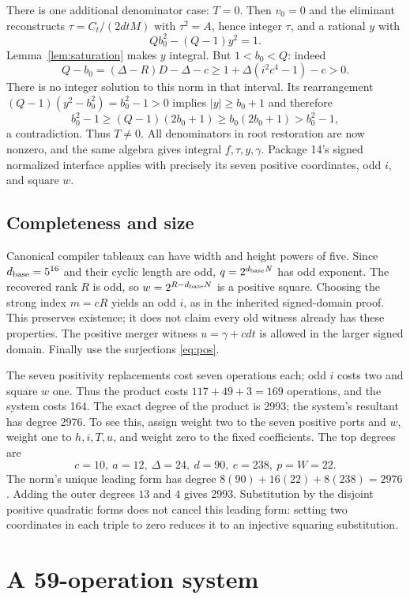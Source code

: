 \documentclass[11pt,letterpaper]{article}
\theoremstyle{remark}\newtheorem{remark}[theorem]{Remark}
\newcommand{\IntegerDegree}{2993}
\begin{document}
There is one additional denominator case: $T=0$. Then $v_0=0$ and the
eliminant reconstructs $\tau=C_t/(2dtM)$ with $\tau^2=A$, hence integer
$\tau$, and a rational $y$ with
\[
 Qb_0^2-(Q-1)y^2=1.
\]
Lemma~\ref{lem:saturation} makes $y$ integral. But $1<b_0<Q$: indeed
\[
 Q-b_0=(\Delta-R)D-\Delta-c
 \geq1+\Delta(i^2c^4-1)-c>0.
\]
There is no integer solution to this norm in that interval. Its rearrangement
$(Q-1)(y^2-b_0^2)=b_0^2-1>0$ implies $|y|\geq b_0+1$ and therefore
\[
 b_0^2-1\geq(Q-1)(2b_0+1)\geq b_0(2b_0+1)>b_0^2-1,
\]
a contradiction. Thus $T\ne0$. All denominators in root restoration are now
nonzero, and the same algebra gives integral $f,\tau,y,\gamma$.
Package 14's signed normalized interface applies with precisely its seven
positive coordinates, odd $i$, and square $w$.

\subsection{Completeness and size}
Canonical compiler tableaux can have width and height powers of five. Since
$d_{\rm base}=5^{16}$ and their cyclic length are odd, $q=2^{d_{\rm base}N}$
has odd exponent. The recovered rank $R$ is odd, so
$w=2^{R-d_{\rm base}N}$ is a positive square. Choosing the strong index
$m=cR$ yields an odd $i$, as in the inherited signed-domain proof. This
preserves existence; it does not claim every old witness already has these
properties. The positive merger witness $u=\gamma+cdt$ is allowed in the
larger signed domain. Finally use the surjections \eqref{eq:pos}.

The seven positivity replacements cost seven operations each; odd $i$ costs
two and square $w$ one. Thus the product costs $117+49+3=169$ operations,
and the system costs 164. The exact degree of the product is \IntegerDegree;
the system's resultant has degree 2976. To see this, assign weight two to
the seven positive ports and $w$, weight one to $h,i,T,u$, and weight zero
to the fixed coefficients. The top degrees are
\[
 c=10,\ a=12,\ \Delta=24,\ d=90,\ e=238,\ p=W=22.
\]
The norm's unique leading form has degree
$8(90)+16(22)+8(238)=2976$. Adding the outer degrees $13$ and $4$ gives
2993. Substitution by the disjoint positive quadratic forms does not cancel
this leading form: setting two coordinates in each triple to zero reduces
it to an injective squaring substitution.

\section{A 59-operation system}\label{sec:system59}
\end{document}

